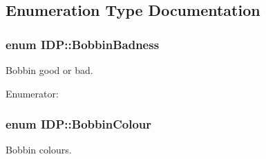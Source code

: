 \subsection{Enumeration Type Documentation}
\hypertarget{namespaceIDP_adf12b2c1e1c228810b18c34a3c88c32d}{
\subsubsection[{BobbinBadness}]{\setlength{\rightskip}{0pt plus 5cm}enum {\bf IDP::BobbinBadness}}}
\label{namespaceIDP_adf12b2c1e1c228810b18c34a3c88c32d}


Bobbin good or bad. 

\begin{Desc}
\item[Enumerator: ]\par
\begin{description}
\item[{\em 
\hypertarget{namespaceIDP_adf12b2c1e1c228810b18c34a3c88c32dafdc1b8b5a9d849fd99ac2ae438b632dd}{
BOBBIN\_\-GOOD}
\label{namespaceIDP_adf12b2c1e1c228810b18c34a3c88c32dafdc1b8b5a9d849fd99ac2ae438b632dd}
}]\item[{\em 
\hypertarget{namespaceIDP_adf12b2c1e1c228810b18c34a3c88c32da6cb4993a316e9d4dc9836d3d990fd0f6}{
BOBBIN\_\-BAD}
\label{namespaceIDP_adf12b2c1e1c228810b18c34a3c88c32da6cb4993a316e9d4dc9836d3d990fd0f6}
}]\end{description}
\end{Desc}

\hypertarget{namespaceIDP_a6efd2cca14c0dae1c6458714ce0218df}{
\subsubsection[{BobbinColour}]{\setlength{\rightskip}{0pt plus 5cm}enum {\bf IDP::BobbinColour}}}
\label{namespaceIDP_a6efd2cca14c0dae1c6458714ce0218df}


Bobbin colours. 

